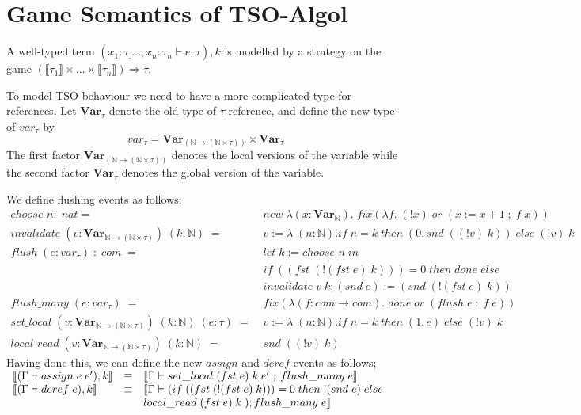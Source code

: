 \documentclass{article}
\begin{document}
\section{Game Semantics of TSO-Algol}
A well-typed term $(x_1 : \tau_,\ldots, x_n : \tau_n \vdash e : \tau), k$ is
modelled by a strategy on the game $(\llbracket \tau_1 \rrbracket \times
\ldots \times \llbracket \tau_n \rrbracket) \Rightarrow \tau$.

To model TSO behaviour we need to have a more complicated
type for references. Let $\mathbf{Var}_{\tau}$ denote the old type of $\tau$ reference, and define the new type of $var_{\tau}$ by
$$var_{\tau} = \mathbf{Var}_{(\mathbb{N} \longrightarrow (\mathbb{N} \times \tau))} \times
\mathbf{Var}_{\tau}$$
The first factor $\mathbf{Var}_{(\mathbb{N} \longrightarrow (\mathbb{N} \times \tau))}$ denotes the local versions of the variable while the second factor
$\mathbf{Var}_{\tau}$ denotes the global version of the variable.

We define flushing events as follows:
\begin{align*}
choose\_n : \; nat = \; &new \; \lambda (x:\mathbf{Var}_{\mathbb{N}}). \;
fix(\lambda f.\; (!x) \; or \; (x:=x+1 \; ; \; f \; x))\\
invalidate \; (v : \mathbf{Var}_{\mathbb{N} 
 \rightarrow (\mathbb{N} \times \tau)}) \; (k : \mathbb{N}) \; = \; &v :=
 \lambda \; (n:\mathbb{N}). if \; n=k \; then \; (0, snd \; ((!v) \; k)) \; else \; (!v) \; k\\
flush \; (e:var_{\tau}) \; : \; com \; = \; &let \; k := choose\_n \; in \\
&if \; ((fst \; (!(fst \; e) \; k))) = 0 \; then \; done \; else \\
&invalidate \; v \; k; (snd \; e):= (snd \; (!(fst \; e) \; k))\\
flush\_many \; (e:var_{\tau}) \; = \; &fix(\lambda(f:com\rightarrow com).\; done \; or
\; (flush \; e \; ; \; f \; e))\\
set\_local \; (v : \mathbf{Var}_{\mathbb{N} 
 \rightarrow (\mathbb{N} \times \tau)}) \; (k : \mathbb{N}) \; (e : \tau) \; = \; 
 & v:= \lambda \; (n:\mathbb{N}). if \; n=k \; then \; (1, e) \; else \; (!v) \; k\\
local\_read \; (v : \mathbf{Var}_{\mathbb{N} 
 \rightarrow (\mathbb{N} \times \tau)}) \; (k : \mathbb{N}) \; = \; &snd \; ((!v) \; k)
\end{align*}
Having done this, we can define the new $assign$ and $deref$ events as follows;
$\begin{array}{l l l}
\llbracket (\Gamma \vdash assign \; e \; e'), k \rrbracket &\equiv
& \llbracket \Gamma \vdash set\_local \; (fst \; e) \; k \; e' \; ; \; flush\_many \; e
\rrbracket\\
\llbracket (\Gamma \vdash deref \; e), k \rrbracket &\equiv
&\llbracket \Gamma \vdash 
(if \; ((fst \; (!(fst \; e) \; k))) = 0 \; then \; !(snd \; e) \; else\\
& &local\_read \; (fst \; e) \; k \;); flush\_many \; e
\rrbracket
\end{array}$
\end{document}
